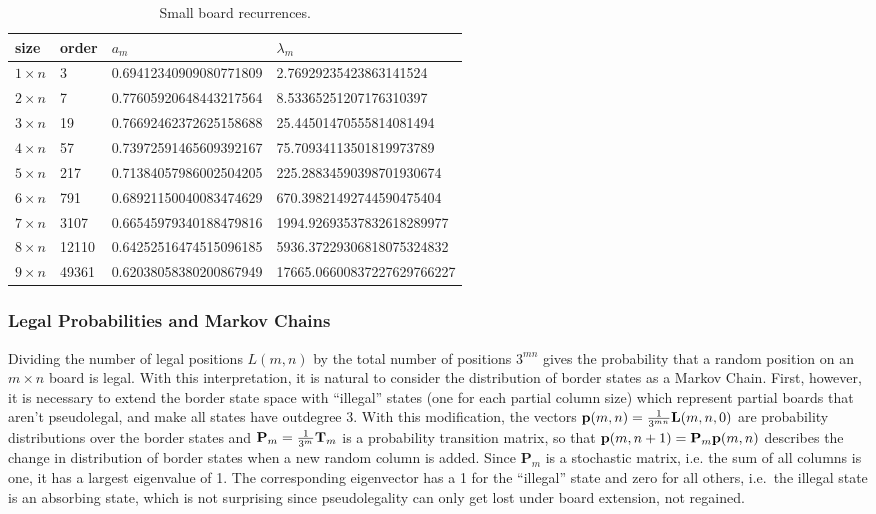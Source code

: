 \documentclass{article}
\begin{document}
\begin{table}
  \begin{center}
    \begin{tabular}{|l|l|l|l|}
      \hline
      size & order & $a_m$ & $\lambda_m$ \\ \hline
      $ 1 \times n$ & 3   & 0.69412340909080771809 & 2.76929235423863141524 \\ \hline
      $ 2 \times n$ & 7   & 0.77605920648443217564 & 8.53365251207176310397 \\ \hline
      $ 3 \times n$ & 19  & 0.76692462372625158688 & 25.44501470555814081494 \\ \hline
      $ 4 \times n$ & 57  & 0.73972591465609392167 & 75.70934113501819973789 \\ \hline
      $ 5 \times n$ & 217 & 0.71384057986002504205 & 225.28834590398701930674 \\ \hline
      $ 6 \times n$ & 791 & 0.68921150040083474629& 670.39821492744590475404 \\ \hline
      $ 7 \times n$ & 3107 & 0.66545979340188479816 & 1994.92693537832618289977 \\ \hline
      $ 8 \times n$ & 12110 & 0.64252516474515096185 & 5936.37229306818075324832 \\ \hline
      $ 9 \times n$ & 49361 & 0.62038058380200867949 & 17665.06600837227629766227 \\ \hline
    \end{tabular}
  \end{center}
  \caption{Small board recurrences.}
  \label{small-board-recurrences}
\end{table}

\subsubsection{Legal Probabilities and Markov Chains}

Dividing the number of legal positions $L(m,n)$ by the total number of
positions $3^{mn}$ gives the probability that a random position on an
$m \times n$ board is legal. With this interpretation, it is natural to
consider the distribution of border states as a Markov Chain. First,
however, it is necessary to extend the border state space with
``illegal'' states (one for each partial column size)
which represent partial boards that aren't pseudolegal,
and make all states have outdegree $3$.
With this modification, the vectors $\mathbf{p}(m,n) = \frac{1}{3^{mn}}
\mathbf{L}(m,n,0)$ are probability distributions over the border states
and $\mathbf{P}_m = \frac{1}{3^m} \mathbf{T}_m$ is a probability
transition matrix, so that $\mathbf{p}(m,n+1) = \mathbf{P}_m \mathbf{p}(m,n)$
describes the change in distribution of border states
when a new random column is added. Since $\mathbf{P}_m$ is a
stochastic matrix, i.e. the sum of all columns is one, it has a
largest eigenvalue of 1. The corresponding eigenvector has a 1 for the
``illegal'' state and zero for all others, i.e.\ the illegal state is
an absorbing state, which is not surprising since
pseudolegality can only get lost under board extension, not regained.
\end{document}
